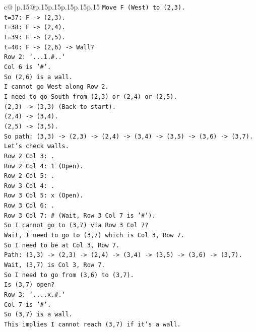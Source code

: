 \documentclass{article}
\begin{document}
{\begin{supertabular}{c@{$\;$}|p{.15\linewidth}@{}p{.15\linewidth}p{.15\linewidth}p{.15\linewidth}p{.15\linewidth}p{.15\linewidth}}
{{{\texttt{Move F (West) to (2,3).} \\
\texttt{t=37: F {-}> (2,3).} \\
\texttt{t=38: F {-}> (2,4).} \\
\texttt{t=39: F {-}> (2,5).} \\
\texttt{t=40: F {-}> (2,6) {-}> Wall?} \\
\texttt{Row 2: `...1.\#..`} \\
\texttt{Col 6 is '\#'.} \\
\texttt{So (2,6) is a wall.} \\
\texttt{I cannot go West along Row 2.} \\
\texttt{I need to go South from (2,3) or (2,4) or (2,5).} \\
\texttt{(2,3) {-}> (3,3) (Back to start).} \\
\texttt{(2,4) {-}> (3,4).} \\
\texttt{(2,5) {-}> (3,5).} \\
\texttt{So path: (3,3) {-}> (2,3) {-}> (2,4) {-}> (3,4) {-}> (3,5) {-}> (3,6) {-}> (3,7).} \\
\texttt{Let's check walls.} \\
\texttt{Row 2 Col 3: .} \\
\texttt{Row 2 Col 4: 1 (Open).} \\
\texttt{Row 2 Col 5: .} \\
\texttt{Row 3 Col 4: .} \\
\texttt{Row 3 Col 5: x (Open).} \\
\texttt{Row 3 Col 6: .} \\
\texttt{Row 3 Col 7: \# (Wait, Row 3 Col 7 is '\#').} \\
\texttt{So I cannot go to (3,7) via Row 3 Col 7?} \\
\texttt{Wait, I need to go to (3,7) which is Col 3, Row 7.} \\
\texttt{So I need to be at Col 3, Row 7.} \\
\texttt{Path: (3,3) {-}> (2,3) {-}> (2,4) {-}> (3,4) {-}> (3,5) {-}> (3,6) {-}> (3,7).} \\
\texttt{Wait, (3,7) is Col 3, Row 7.} \\
\texttt{So I need to go from (3,6) to (3,7).} \\
\texttt{Is (3,7) open?} \\
\texttt{Row 3: `....x.\#.`} \\
\texttt{Col 7 is '\#'.} \\
\texttt{So (3,7) is a wall.} \\
\texttt{This implies I cannot reach (3,7) if it's a wall.} \\
}}}
\end{supertabular}}
\end{document}
